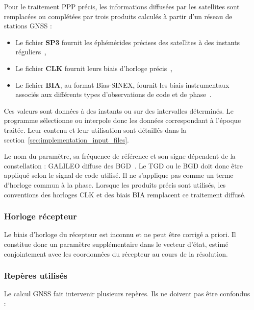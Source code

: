 Pour le traitement PPP précis, les informations diffusées par les satellites
sont remplacées ou complétées par trois produits calculés à partir d'un réseau
de stations GNSS :

\begin{itemize}
    \item Le fichier \textbf{SP3} fournit les éphémérides précises des satellites
    à des instants réguliers~\cite{hilla2016sp3d},
    \item Le fichier \textbf{CLK} fournit leurs biais d'horloge
    précis~\cite{rinexClock304},
    \item Le fichier \textbf{BIA}, au format Bias-SINEX, fournit les biais
    instrumentaux associés aux différents types d'observations de code et de
    phase~\cite{schaerSinexBias}.
\end{itemize}

Ces valeurs sont données à des instants ou sur des intervalles déterminés. Le
programme sélectionne ou interpole donc les données correspondant à l'époque
traitée. Leur contenu et leur utilisation sont détaillés dans la
section~\ref{sec:implementation_input_files}.

Le nom du paramètre, sa fréquence de référence et son signe dépendent de la
constellation : GALILEO diffuse des BGD~\cite{galileoOsSisIcd21}. Le TGD ou le BGD doit donc
être appliqué selon le signal de code utilisé. Il ne s'applique pas comme un
terme d'horloge commun à la phase. Lorsque les produits précis sont utilisés,
les conventions des horloges CLK et des biais BIA remplacent ce traitement
diffusé.

\subsubsection{Horloge récepteur}

Le biais d'horloge du récepteur est inconnu et ne peut être corrigé a priori. Il constitue donc un paramètre supplémentaire dans le vecteur d'état, estimé conjointement avec les coordonnées du récepteur au cours de la résolution.

\subsubsection{Repères utilisés}

Le calcul GNSS fait intervenir plusieurs repères. Ils ne doivent pas être
confondus :

